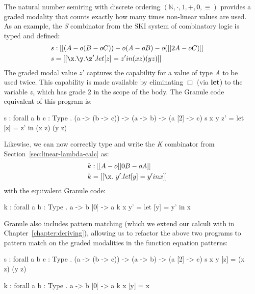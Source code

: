\begin{example}
\label{ex:s-comb}
  The natural number semiring with discrete ordering $(\mathbb{N}, \cdot, 1, +,
  0, \equiv)$ provides a graded modality that counts exactly how many times
  non-linear values are used. As an example, the \emph{S} combinator from
  the SKI system of combinatory logic is typed and defined:
\begin{align*}
s & : [[ (A -o (B -o C)) -o {(A -o B) -o ({[] 2 A} -o C)} ]] \\
s & = [[ \x . {\y . {\z' . {let [ z ] = z' in {(x z) (y z)}}}} ]]
\end{align*}
The graded modal value $z'$ captures the capability for a value
of type $A$ to be used twice. This capability is made available by eliminating
$\Box$ (via \textbf{let}) to the variable $z$, which has
grade $2$ in the scope of the body. 
The Granule code equivalent of this program is:
\begin{granule}
s : forall { a b c : Type } 
  . (a -> (b -> c)) -> (a -> b) -> (a [2] -> c)
s x y z' = let [z] = z' in (x z) (y z)
\end{granule}
Likewise, we can now correctly type and write the \emph{K} combinator from
Section~\ref{sec:linear-lambda-calc} as:
\begin{align*}
k & : [[ {A -o [] 0 B} -o A ]] \\
k & = [[ \x . \ y' . {let [ y ] = y' in x }]]
\end{align*}
with the equivalent Granule code:
\begin{granule}
k : forall { a b : Type } . a -> b [0] -> a
k x y' = let [y] = y' in x
\end{granule}
Granule also includes pattern matching (which we extend our calculi with in
Chapter~\ref{chapter:deriving}), allowing us to refactor the above two programs
to pattern match on the graded modalities in the function equation patterns:
\begin{granule}
s : forall { a b c : Type } 
  . (a -> (b -> c)) -> (a -> b) -> (a [2] -> c)
s x y [z] = (x z) (y z)

k : forall { a b : Type } . a -> b [0] -> a
k x [y] = x
\end{granule}


\end{example}
